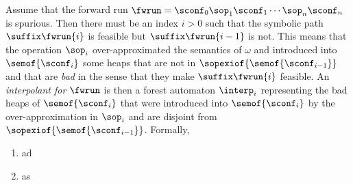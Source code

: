 {%
%
Assume that the forward run $\fwrun = \sconf_0\sop_1\sconf_1\cdots\sop_n\sconf_n$ is spurious. 
Then there must be an index $i>0$ 
such that the symbolic path $\suffix \fwrun {i}$ is feasible 
but $\suffix \fwrun {i-1}$ is not.
This means that the operation $\sop_i$  over-approximated the semantics of $\omega$ and 
introduced into $\semof{\sconf_{i}}$ some heaps that are not in $\sopexiof{\semof{\sconf_{i-1}}}$ 
and that are \emph{bad} in the sense that they make $\suffix \fwrun {i}$ feasible.
%
An \emph{interpolant for $\fwrun$}
is then a forest automaton $\interp_i$ representing
the bad heaps
of $\semof{\sconf_i}$ that were introduced into $\semof{\sconf_{i}}$ by the
over-approximation in $\sop_i$ and are
disjoint from $\sopexiof{\semof{\sconf_{i-1}}}$.
Formally,
%
\begin{enumerate}
\item ad %
\item as %
\end{enumerate}
%
%

}
